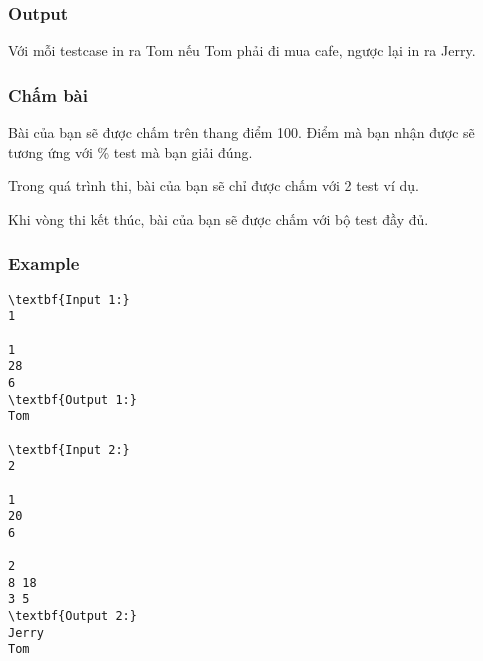 \subsubsection{Output}

Với mỗi testcase in ra Tom nếu Tom phải đi mua cafe, ngược lại in ra Jerry.

\subsubsection{Chấm bài}

Bài của bạn sẽ được chấm trên thang điểm 100. Điểm mà bạn nhận được sẽ tương ứng với \% test mà bạn giải đúng.

Trong quá trình thi, bài của bạn sẽ chỉ được chấm với 2 test ví dụ.

Khi vòng thi kết thúc, bài của bạn sẽ được chấm với bộ test đầy đủ.

\subsubsection{Example}
\begin{verbatim}
\textbf{Input 1:}
1

1
28
6
\textbf{Output 1:}
Tom

\textbf{Input 2:}
2

1
20
6

2
8 18
3 5
\textbf{Output 2:}
Jerry
Tom\end{verbatim}